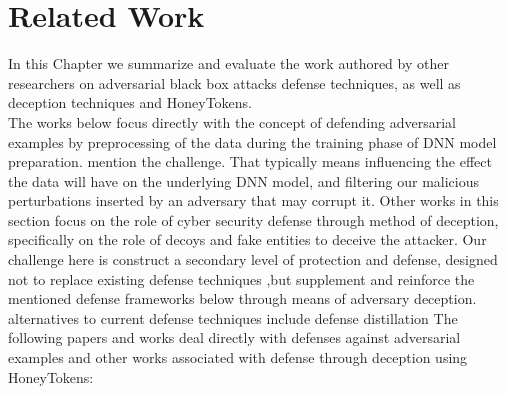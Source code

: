 \documentclass[grad,lot,lof,11pt,oneside,onehalfspace]{RUthesis}
\begin{document}
\chapter{Related Work}
In this Chapter we summarize and evaluate the work authored by other researchers on adversarial black box attacks defense techniques, as well as deception techniques and HoneyTokens.\\
The works below focus directly with the concept of defending adversarial examples by preprocessing of the data during the training phase of DNN model preparation. mention the challenge. That typically means influencing the effect the data will have on the underlying DNN model, and filtering our malicious perturbations inserted by an adversary that may corrupt it. Other works in this section focus on the role of cyber security defense through method of deception, specifically on the role of decoys and fake entities to deceive the attacker. Our challenge here is construct a secondary level of protection and defense, designed not to replace existing defense techniques ,but supplement and reinforce the mentioned defense frameworks below through means of adversary deception.\\
alternatives to current defense techniques include defense distillation 
The following papers and works deal directly with defenses against adversarial examples and other works associated with defense through deception using HoneyTokens:
\renewcommand{\theenumi}{\roman{enumi}}%
\end{document}
